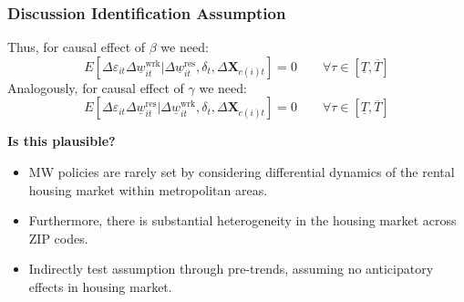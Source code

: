 \documentclass[aspectratio=169, t]{beamer}
\newcommand{\MW}{\underline{w}}
\begin{document}
\begin{frame}
	\frametitle{Discussion Identification Assumption}
	
	Thus, for causal effect of $\beta$ we need:
	$$
	E \left[\Delta \varepsilon_{it} \Delta \MW^{\text{wrk}}_{it}  
	\big| \Delta \MW^{\text{res}}_{it}, \delta_t, \Delta 
	\mathbf{X}_{c(i)t} \right] = 0
	\quad \quad \forall \tau \in \left[ \underline{T}, \overline{T} \right]
	$$
	\vspace{.5mm}
	Analogously, for causal effect of $\gamma$ we need:
	$$
	E \left[\Delta \varepsilon_{it} \Delta \MW^{\text{res}}_{it}  
	\big| \Delta \MW^{\text{wrk}}_{it}, \delta_t, \Delta \mathbf{X}_{c(i)t} 
	\right] = 0
	\quad \quad \forall \tau \in \left[ \underline{T}, \overline{T} \right]
	$$
	
	\pause
	\vspace{.5mm}
	\textbf{Is this plausible?}
	\begin{itemize} \small
		\vspace{.5mm}
		\item MW policies are rarely set by considering differential dynamics of the 
		rental housing market within metropolitan areas.
		
		\vspace{.5mm}
		\item Furthermore, there is substantial heterogeneity in the housing market 
		across ZIP codes.
		
		\vspace{.5mm}
		\item Indirectly test assumption through pre-trends, assuming no anticipatory 
		effects in housing market.
	\end{itemize}
\end{frame}
\end{document}
